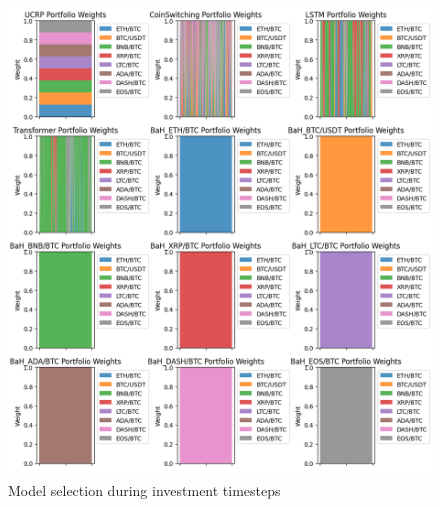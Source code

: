 \begin{figure}[H]
	\centering
	\includegraphics[scale=0.45]{./changes1.png}
	\caption{Model selection during investment timesteps}
	\label{fig:changes1}
\end{figure}

